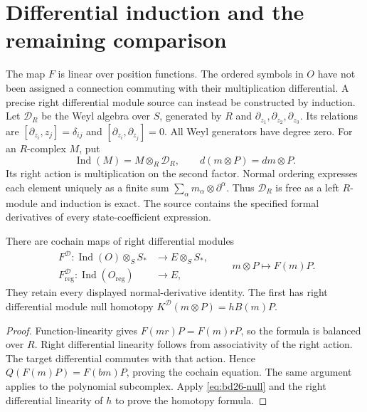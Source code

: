 \section{Differential induction and the remaining comparison}

The map $F$ is linear over position functions.
The ordered symbols in $O$ have not been assigned a connection commuting with their multiplication differential.
A precise right differential module source can instead be constructed by induction.
Let $\mathcal D_R$ be the Weyl algebra over $S$, generated by $R$ and $\partial_{z_1},\partial_{z_2},\partial_{z_3}$.
Its relations are $[\partial_{z_i},z_j]=\delta_{ij}$ and $[\partial_{z_i},\partial_{z_j}]=0$.
All Weyl generators have degree zero.
For an $R$-complex $M$, put
\begin{equation}\label{eq:bd26-induction}
 \operatorname{Ind}(M)=M\otimes_R\mathcal D_R,
 \qquad d(m\otimes P)=dm\otimes P.
\end{equation}
Its right action is multiplication on the second factor.
Normal ordering expresses each element uniquely as a finite sum
$\sum_\alpha m_\alpha\otimes\partial^\alpha$.
Thus $\mathcal D_R$ is free as a left $R$-module and induction is exact.
The source contains the specified formal derivatives of every state-coefficient expression.

\begin{proposition}\label{prop:bd26-induced-comparison}
There are cochain maps of right differential modules
\[
 \begin{aligned}
 F^{\mathcal D}:\operatorname{Ind}(O)\otimes_S S_*&\longrightarrow E\otimes_S S_*,\\
 F_{\mathrm{reg}}^{\mathcal D}:\operatorname{Ind}(O_{\mathrm{reg}})&\longrightarrow E,
 \end{aligned}
 \qquad m\otimes P\longmapsto F(m)P.
\]
They retain every displayed normal-derivative identity.
The first has right differential module null homotopy
$K^{\mathcal D}(m\otimes P)=hB(m)P$.
\end{proposition}
\begin{proof}
Function-linearity gives $F(mr)P=F(m)rP$, so the formula is balanced over $R$.
Right differential linearity follows from associativity of the right action.
The target differential commutes with that action.
Hence $Q(F(m)P)=F(bm)P$, proving the cochain equation.
The same argument applies to the polynomial subcomplex.
Apply \eqref{eq:bd26-null} and the right differential linearity of $h$ to prove the homotopy formula.
\end{proof}

